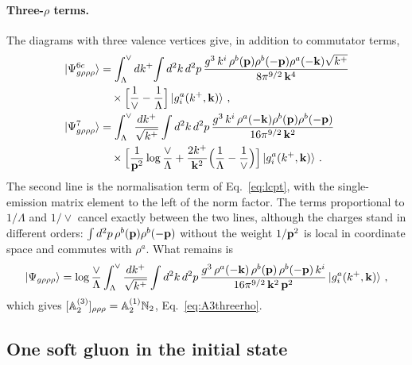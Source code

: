 \paragraph{Three-$\rho$ terms.} The diagrams with three valence vertices give, in addition to commutator terms,
\begin{align}
\ket{\Psi^{6c}_{g\rho\rho\rho}}&=\int_\Lambda^\vee dk^+\!\int d^2k\,d^2p\,\frac{g^3\,k^i\,\rho^b(\mathbf{p})\rho^b(-\mathbf{p})\rho^a(-\mathbf{k})\sqrt{k^+}}{8\pi^{9/2}\,\mathbf{k}^4}\notag\\&\quad\times\Big[\frac1\vee-\frac1\Lambda\Big]\ket{g^a_i(k^+,\mathbf{k})}\,,\notag\\
\ket{\Psi^{7}_{g\rho\rho\rho}}&=\int_\Lambda^\vee\frac{dk^+}{\sqrt{k^+}}\int d^2k\,d^2p\,\frac{g^3\,k^i\,\rho^a(-\mathbf{k})\rho^b(\mathbf{p})\rho^b(-\mathbf{p})}{16\pi^{9/2}\,\mathbf{k}^2}\notag\\&\quad\times\Big[\frac{1}{\mathbf{p}^2}\log\frac{\vee}{\Lambda}+\frac{2k^+}{\mathbf{k}^2}\Big(\frac1\Lambda-\frac1\vee\Big)\Big]\ket{g^a_i(k^+,\mathbf{k})}\,.
\end{align}
The second line is the normalisation term of Eq.~\eqref{eq:lcpt}, with the single-emission matrix element to the left of the norm factor. The terms proportional to $1/\Lambda$ and $1/\vee$ cancel exactly between the two lines, although the charges stand in different orders: $\int d^2p\,\rho^b(\mathbf{p})\rho^b(-\mathbf{p})$ without the weight $1/\mathbf{p}^2$ is local in coordinate space and commutes with $\rho^a$. What remains is
\begin{align}\label{eq:Psigrhorhorho}
\ket{\Psi_{g\rho\rho\rho}}=\log\frac{\vee}{\Lambda}\int_\Lambda^\vee\frac{dk^+}{\sqrt{k^+}}\int d^2k\,d^2p\,\frac{g^3\,\rho^a(-\mathbf{k})\,\rho^b(\mathbf{p})\,\rho^b(-\mathbf{p})\,k^i}{16\pi^{9/2}\,\mathbf{k}^2\,\mathbf{p}^2}\ket{g^a_i(k^+,\mathbf{k})}\,,
\end{align}
which gives $[\mathbb{A}^{(3)}_2]_{\rho\rho\rho}=\mathbb{A}^{(1)}_2\mathbb{N}_2$, Eq.~\eqref{eq:A3threerho}.

\subsection{One soft gluon in the initial state}

